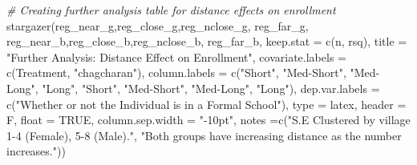 \documentclass[
]{article}
\newenvironment{Shaded}{\begin{snugshade}}{\end{snugshade}}
\newcommand{\AttributeTok}[1]{\textcolor[rgb]{0.77,0.63,0.00}{#1}}
\newcommand{\CommentTok}[1]{\textcolor[rgb]{0.56,0.35,0.01}{\textit{#1}}}
\newcommand{\ConstantTok}[1]{\textcolor[rgb]{0.00,0.00,0.00}{#1}}
\newcommand{\FunctionTok}[1]{\textcolor[rgb]{0.00,0.00,0.00}{#1}}
\newcommand{\NormalTok}[1]{#1}
\newcommand{\StringTok}[1]{\textcolor[rgb]{0.31,0.60,0.02}{#1}}
\begin{document}
\begin{Shaded}
\begin{Highlighting}[]
\CommentTok{\# Creating further analysis table for distance effects on enrollment}
\FunctionTok{stargazer}\NormalTok{(reg\_near\_g,reg\_close\_g,reg\_nclose\_g, reg\_far\_g, }
\NormalTok{          reg\_near\_b,reg\_close\_b,reg\_nclose\_b, reg\_far\_b, }
          \AttributeTok{keep.stat =} \FunctionTok{c}\NormalTok{(}\StringTok{\textquotesingle{}n\textquotesingle{}}\NormalTok{, }\StringTok{\textquotesingle{}rsq\textquotesingle{}}\NormalTok{),}
          \AttributeTok{title =} \StringTok{"Further Analysis: Distance Effect on Enrollment"}\NormalTok{,}
          \AttributeTok{covariate.labels =} \FunctionTok{c}\NormalTok{(}\StringTok{\textquotesingle{}Treatment\textquotesingle{}}\NormalTok{, }\StringTok{"chagcharan"}\NormalTok{),}
          \AttributeTok{column.labels =} \FunctionTok{c}\NormalTok{(}\StringTok{"Short"}\NormalTok{, }\StringTok{"Med{-}Short"}\NormalTok{, }\StringTok{"Med{-}Long"}\NormalTok{, }
                            \StringTok{"Long"}\NormalTok{, }\StringTok{"Short"}\NormalTok{, }\StringTok{"Med{-}Short"}\NormalTok{, }\StringTok{"Med{-}Long"}\NormalTok{, }\StringTok{"Long"}\NormalTok{),}
          \AttributeTok{dep.var.labels =} \FunctionTok{c}\NormalTok{(}\StringTok{"Whether or not the Individual is in a Formal School"}\NormalTok{), }
          \AttributeTok{type =} \StringTok{\textquotesingle{}latex\textquotesingle{}}\NormalTok{, }\AttributeTok{header =}\NormalTok{ F, }\AttributeTok{float =} \ConstantTok{TRUE}\NormalTok{, }
          \AttributeTok{column.sep.width =} \StringTok{"{-}10pt"}\NormalTok{,}
          \AttributeTok{notes =}\FunctionTok{c}\NormalTok{(}\StringTok{"S.E Clustered by village 1{-}4 (Female), 5{-}8 (Male)."}\NormalTok{, }
          \StringTok{"Both groups have increasing distance as the number increases."}\NormalTok{))}
\end{Highlighting}
\end{Shaded}
\end{document}
